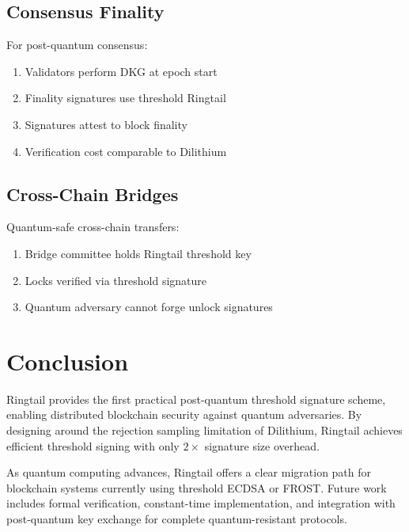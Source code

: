 \documentclass[11pt,a4paper]{article}
\begin{document}
\subsection{Consensus Finality}

For post-quantum consensus:
\begin{enumerate}
    \item Validators perform DKG at epoch start
    \item Finality signatures use threshold Ringtail
    \item Signatures attest to block finality
    \item Verification cost comparable to Dilithium
\end{enumerate}

\subsection{Cross-Chain Bridges}

Quantum-safe cross-chain transfers:
\begin{enumerate}
    \item Bridge committee holds Ringtail threshold key
    \item Locks verified via threshold signature
    \item Quantum adversary cannot forge unlock signatures
\end{enumerate}

\section{Conclusion}

Ringtail provides the first practical post-quantum threshold signature scheme, enabling distributed blockchain security against quantum adversaries. By designing around the rejection sampling limitation of Dilithium, Ringtail achieves efficient threshold signing with only $2\times$ signature size overhead.

As quantum computing advances, Ringtail offers a clear migration path for blockchain systems currently using threshold ECDSA or FROST. Future work includes formal verification, constant-time implementation, and integration with post-quantum key exchange for complete quantum-resistant protocols.
\end{document}
